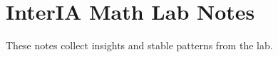 \documentclass{interia-article}
\begin{document}
\section*{InterIA Math Lab Notes}
These notes collect insights and stable patterns from the lab.
\end{document}
